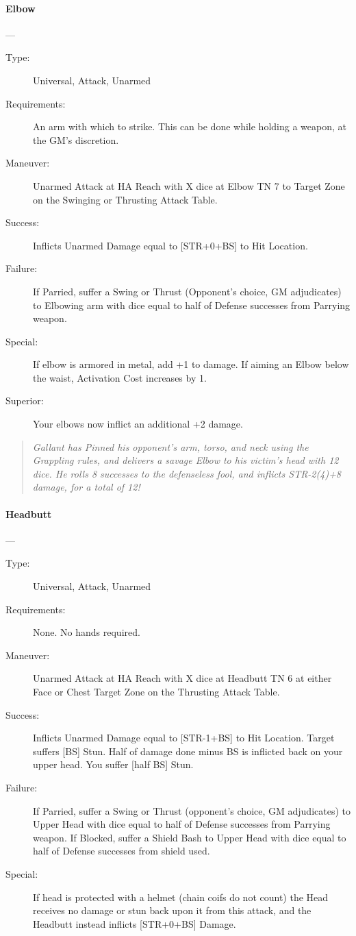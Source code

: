 \documentclass[oneside,11pt,english]{book}
\begin{document}
\paragraph{\large\label{man:Elbow}Elbow}---\quad{\large[X]}
\vspace{-10pt}\begin{description} 
\item [Type:] Universal, Attack, Unarmed 
\item [Requirements:] An arm with which to strike. This can be done while holding a weapon, at the GM's 
discretion. 
\item [Maneuver:] Unarmed Attack at HA Reach with X dice at Elbow TN 7 to Target Zone on the Swinging or 
Thrusting Attack Table. 
\item [Success:] Inflicts Unarmed Damage equal to [STR+0+BS] to Hit Location. 
\item [Failure:] If Parried, suffer a Swing or Thrust (Opponent’s choice, GM adjudicates) to Elbowing arm with 
dice equal to half of Defense successes from Parrying weapon. 
\item [Special:] If elbow is armored in metal, add +1 to damage. 
If aiming an Elbow below the waist, Activation Cost increases by 1. 
\item [Superior:] Your elbows now inflict an additional +2 damage. 
\end{description}
\begin{quotation}
\emph{Gallant has Pinned his opponent’s arm, torso, and neck using the Grappling rules, and delivers a savage Elbow to his victim’s 
head with 12 dice. He rolls 8 successes to the defenseless fool, and inflicts STR-2(4)+8 damage, for a total of 12! }
\end{quotation}

\paragraph{\large\label{man:Headbutt}Headbutt}---\quad{\large[X+1]}
\vspace{-10pt}\begin{description} 
\item [Type:] Universal, Attack, Unarmed 
\item [Requirements:] None. No hands required. 
\item [Maneuver:] Unarmed Attack at HA Reach with X dice at Headbutt TN 6 at either Face or Chest Target 
Zone on the Thrusting Attack Table. 
\item [Success:] Inflicts Unarmed Damage equal to [STR-1+BS] to Hit Location. Target suffers [BS] Stun. Half 
of damage done minus BS is inflicted back on your upper head. You suffer [half BS] Stun. 
\item [Failure:] If Parried, suffer a Swing or Thrust (opponent’s choice, GM adjudicates) to Upper Head with 
dice equal to half of Defense successes from Parrying weapon. If Blocked, suffer a Shield Bash to Upper 
Head with dice equal to half of Defense successes from shield used. 
\item [Special:] If head is protected with a helmet (chain coifs do not count) the Head receives no damage or stun 
back upon it from this attack, and the Headbutt instead inflicts [STR+0+BS] Damage. 
\end{description}
\end{document}
